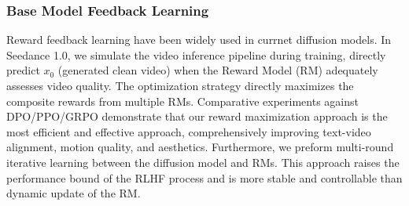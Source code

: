 




\subsubsection{Base Model Feedback Learning}
Reward feedback learning  \cite{xue2025dancegrpo,zhang2024onlinevpo,liu2025flow,liu2025improving} have been widely used in currnet diffusion models. In Seedance 1.0, we simulate the video inference pipeline during training, directly predict $x_0$ (generated clean video) when the Reward Model (RM) adequately assesses video quality. The optimization strategy directly maximizes the composite rewards from multiple RMs. Comparative experiments against DPO/PPO/GRPO demonstrate that our reward maximization approach is the most efficient and effective approach, comprehensively improving text-video alignment, motion quality, and aesthetics. Furthermore, we preform multi-round iterative learning between the diffusion model and RMs. This approach raises the performance bound of the RLHF process and is more stable and controllable than dynamic update of the RM.

